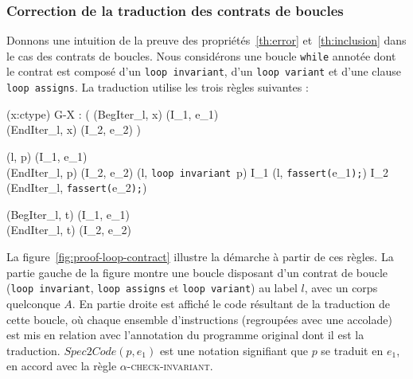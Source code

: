 \subsubsection{Correction de la traduction des contrats de boucles}


Donnons une intuition de la preuve des propriétés~\ref{th:error}
et~\ref{th:inclusion} dans le cas des contrats de boucles.
Nous considérons une boucle \lstinline'while' annotée dont le contrat est
composé d'un \lstinline'loop invariant', d'un \lstinline'loop variant' et
d'une clause \lstinline'loop assigns'.
La traduction utilise les trois règles suivantes :


{\scriptsize
  {
    {
      \forall (x:ctype) \in G-X :
      (
      (BegIter_l, x) \trule (I_1, e_1) \\
      (EndIter_l, x) \trule (I_2, e_2)
      )
    }
    {
       {
      }
    }{}
  }
}

{\scriptsize
  {
    {(l, p) \prule (I_1, e_1) \\
      (EndIter_l, p) \prule (I_2, e_2)}
    {
      (l, \mbox{\lstinline'loop invariant'}~p\semicolon) \arule
      I_1 \concat (l, \mbox{\lstinline'fassert('}e_1\mbox{\lstinline');'})
      \concat I_2 \concat
      (EndIter_l, \mbox{\lstinline'fassert('}e_2\mbox{\lstinline');'})
    }{}
  }
}

{\scriptsize
  {
    {
      (BegIter_l, t) \trule (I_1, e_1) \\
      (EndIter_l, t) \trule (I_2, e_2)
    }
    {
    }{}
  }
}


La figure~\ref{fig:proof-loop-contract} illustre la démarche à partir de ces
règles.
La partie gauche de la figure montre une boucle disposant d'un contrat de boucle
(\lstinline'loop invariant', \lstinline'loop assigns' et
\lstinline'loop variant') au label $l$, avec un corps quelconque $A$.
En partie droite est affiché le code résultant de la traduction de cette
boucle, où chaque ensemble d'instructions (regroupées avec une accolade) est
mis en relation avec l'annotation du programme original dont il est la
traduction.
$\mathit{Spec2Code}(p, e_1)$ est une notation signifiant que $p$ se traduit en
$e_1$, en accord avec la règle \textsc{$\alpha$-check-invariant}.

